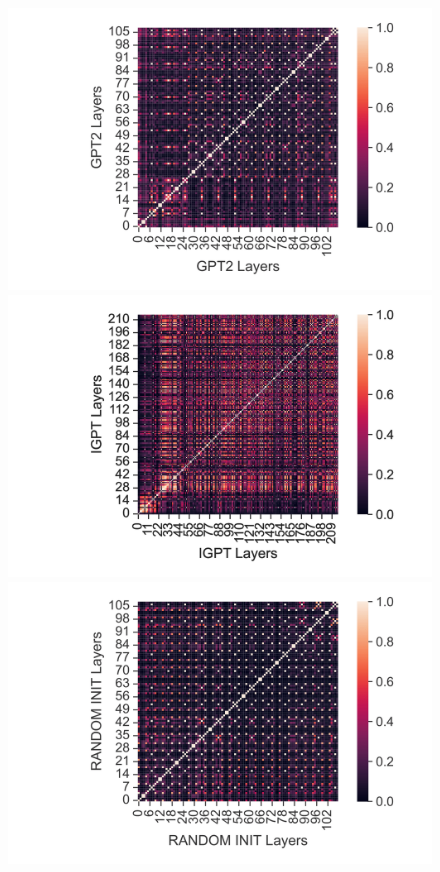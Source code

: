 \documentclass{article}
\begin{document}
\begin{figure}[H]
    \centering
    \begin{minipage}[b]{0.32\linewidth}
        \includegraphics[width=\linewidth]{figs/cka_40_40_gpt2gpt2_halfcheetah_medium_666_reward.png}
    \end{minipage}
    \begin{minipage}[b]{0.32\linewidth}
        \includegraphics[width=\linewidth]{figs/cka_40_40_igptigpt_halfcheetah_medium_666_reward.png}
    \end{minipage}
    \begin{minipage}[b]{0.32\linewidth}
        \includegraphics[width=\linewidth]{figs/cka_40_40_dtdt_halfcheetah_medium_666_reward.png}

\end{minipage}
\end{figure}
\end{document}
